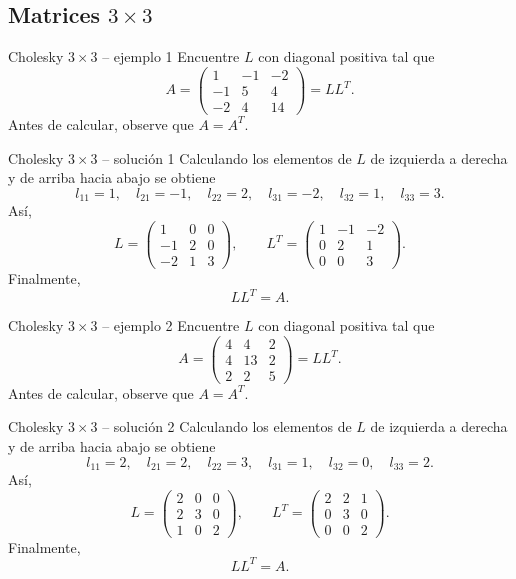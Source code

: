 \documentclass[aspectratio=169,10pt]{beamer}
\begin{document}
\subsection{Matrices $3\times 3$}
\begin{frame}{Cholesky $3\times 3$ -- ejemplo 1}
\small
Encuentre $L$ con diagonal positiva tal que
\[
A=\begin{pmatrix}1 & -1 & -2\\-1 & 5 & 4\\-2 & 4 & 14\end{pmatrix}=LL^T.
\]
Antes de calcular, observe que $A=A^T$.
\end{frame}
\begin{frame}{Cholesky $3\times 3$ -- solución 1}
\small
Calculando los elementos de $L$ de izquierda a derecha y de arriba hacia abajo se obtiene
\[
l_{11}=1,\quad l_{21}=-1,\quad l_{22}=2,\quad l_{31}=-2,\quad l_{32}=1,\quad l_{33}=3.
\]
Así,
\[
L=\begin{pmatrix}1 & 0 & 0\\-1 & 2 & 0\\-2 & 1 & 3\end{pmatrix},\qquad L^T=\begin{pmatrix}1 & -1 & -2\\0 & 2 & 1\\0 & 0 & 3\end{pmatrix}.
\]
Finalmente,
\[
\boxed{LL^T=A}.
\]
\end{frame}
\begin{frame}{Cholesky $3\times 3$ -- ejemplo 2}
\small
Encuentre $L$ con diagonal positiva tal que
\[
A=\begin{pmatrix}4 & 4 & 2\\4 & 13 & 2\\2 & 2 & 5\end{pmatrix}=LL^T.
\]
Antes de calcular, observe que $A=A^T$.
\end{frame}
\begin{frame}{Cholesky $3\times 3$ -- solución 2}
\small
Calculando los elementos de $L$ de izquierda a derecha y de arriba hacia abajo se obtiene
\[
l_{11}=2,\quad l_{21}=2,\quad l_{22}=3,\quad l_{31}=1,\quad l_{32}=0,\quad l_{33}=2.
\]
Así,
\[
L=\begin{pmatrix}2 & 0 & 0\\2 & 3 & 0\\1 & 0 & 2\end{pmatrix},\qquad L^T=\begin{pmatrix}2 & 2 & 1\\0 & 3 & 0\\0 & 0 & 2\end{pmatrix}.
\]
Finalmente,
\[
\boxed{LL^T=A}.
\]
\end{frame}
\end{document}
